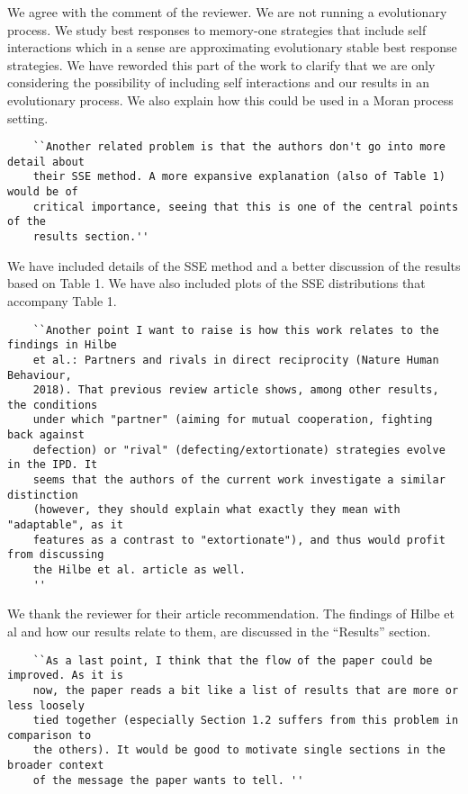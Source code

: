 \documentclass{article}
\begin{document}
We agree with the comment of the reviewer. We are not running a evolutionary
process. We study best
responses to memory-one strategies that include self interactions which in a sense are
approximating evolutionary stable best response strategies. We have reworded
this part of the work to clarify that we are only considering the possibility of
including self interactions and our results in an evolutionary process. We also explain how this could be
used in a Moran process setting.

\begin{verbatim}
    ``Another related problem is that the authors don't go into more detail about
    their SSE method. A more expansive explanation (also of Table 1) would be of
    critical importance, seeing that this is one of the central points of the
    results section.''
\end{verbatim}

We have included details of the SSE method and a better
discussion of the results based on Table 1. We have also included plots of the
SSE distributions that accompany Table 1.

\begin{verbatim}
    ``Another point I want to raise is how this work relates to the findings in Hilbe
    et al.: Partners and rivals in direct reciprocity (Nature Human Behaviour,
    2018). That previous review article shows, among other results, the conditions
    under which "partner" (aiming for mutual cooperation, fighting back against
    defection) or "rival" (defecting/extortionate) strategies evolve in the IPD. It
    seems that the authors of the current work investigate a similar distinction
    (however, they should explain what exactly they mean with "adaptable", as it
    features as a contrast to "extortionate"), and thus would profit from discussing
    the Hilbe et al. article as well.
    ''
\end{verbatim}

We thank the reviewer for their article recommendation. The findings of Hilbe et
 al and how our results relate to them, are discussed in the ``Results'' section. %

\begin{verbatim}
    ``As a last point, I think that the flow of the paper could be improved. As it is
    now, the paper reads a bit like a list of results that are more or less loosely
    tied together (especially Section 1.2 suffers from this problem in comparison to
    the others). It would be good to motivate single sections in the broader context
    of the message the paper wants to tell. ''
\end{verbatim}
\end{document}
